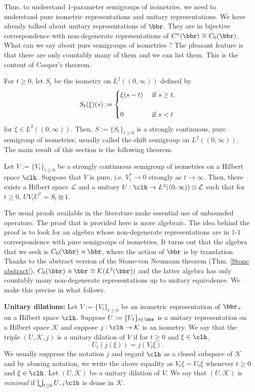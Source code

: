 Thus, to understand $1$-parameter semigroups of isometries, we need to understand pure isometric representations and unitary representations. We have already talked about  
 unitary representations of $\bbr$. They are in bijective correspondence with non-degenerate representations of $C^{*}(\bbr) \cong C_0(\bbr)$. What can we say about pure semigroups of isometries ? 
 The pleasant feature is that there are only countably many of them and we can list them. This is the content of Cooper's theorem. 

For $t \geq 0$, let $S_t$ be the isometry on $L^{2}((0,\infty))$ defined by \begin{equation}
\label{isometries}
S_{t}(\xi)(s):=\begin{cases}
 \xi(s-t)  & \mbox{ if
} s  \geq t,\cr
   &\cr
    0 &  \mbox{ if } s<t
         \end{cases}
\end{equation}
for $\xi \in L^{2}((0,\infty))$. Then, $S:=\{S_t\}_{t \geq 0}$ is a strongly continuous, pure semigroup of isometries, usually called the shift semigroup on $L^{2}((0,\infty))$. The main result of this section 
is the following theorem. 
\begin{thm}[Cooper]
\label{Cooper}
Let $V:=\{V_t\}_{t \geq 0}$ be a strongly continuous semigroup of isometries on a Hilbert space $\clh$. Suppose that $V$ is pure, i.e. $V_t^{*} \to 0$ strongly as $t \to \infty$. Then, 
there exists a Hilbert space $\mathcal{L}$ and a unitary $U:\clh \to L^{2}((0,\infty)) \otimes \mathcal{L}$ such that 
 for $t \geq 0$, 
$
UV_tU^{*}=S_t \otimes 1$.
\end{thm}

The usual proofs available in the literature make essential use of unbounded operators. The proof that is provided here is more algebraic.  The idea behind the proof is to look for  an algebra whose non-degenerate
representations are in $1$-$1$ correspondence with pure semigroups of isometries. It turns out that the algebra that we seek is $C_0(\bbr) \rtimes \bbr$, where the action of $\bbr$ is by translation.
Thanks to the abstract version of the Stone-von Neumann theorem (Thm. \ref{Stone abstract}), $C_0(\bbr) \rtimes \bbr \cong \mathcal{K}(L^{2}(\bbr))$ and the latter algebra has only countably
many non-degenerate representations up to unitary equivalence. We make this precise in what follows. 


\textbf{Unitary dilations:} Let $V:=\{V_t\}_{t \geq 0}$ be an isometric representation of $\bbr_+$ on a Hilbert space $\clh$. Suppose $U:=\{U_t\}_{t \in \bbr}$ is a unitary representation on a Hilbert space $\mathcal{K}$ and suppose $j:\clh \to \mathcal{K}$ is an isometry. We say that the triple $(U,\mathcal{K},j)$ is a unitary dilation of $V$ if for $t \geq 0$ and $\xi \in \clh$, 
\[
U_t(j(\xi))=j(V_t\xi).\]
We usually suppress the notation $j$ and regard $\clh$ as a closed subspace of $\mathcal{K}$ and by abusing notation, we write the above equality as $V_t\xi=U_t\xi$ whenever $t \geq 0$ and $\xi \in \clh$. Let $(U,\mathcal{K})$ be a unitary dilation of $V$. We say that $(U,\mathcal{K})$ is \emph{minimal} if $\bigcup_{t \geq 0}U_{-t}\clh$ is dense in $\mathcal{K}$.  

